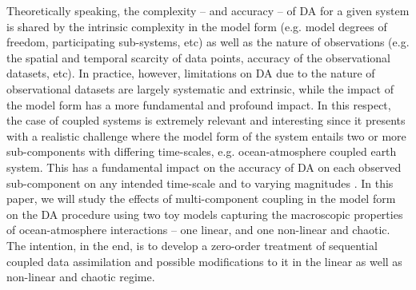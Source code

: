 \documentclass[a4paper,10pt]{article}
\begin{document}
\begin{multicols}{2}
Theoretically speaking, the complexity -- and accuracy -- of \textsf{DA} for a given system is shared by the intrinsic complexity in the model form (e.g. model degrees of freedom, participating sub-systems, etc) as well as the nature of observations (e.g. the spatial and temporal scarcity of data points, accuracy of the observational datasets, etc). In practice, however, limitations on \textsf{DA} due to the nature of observational datasets are largely systematic and extrinsic, while the impact of the model form has a more fundamental and profound impact. In this respect, the case of coupled systems is extremely relevant and interesting since it presents with a realistic challenge where the model form of the system entails two or more sub-components with differing time-scales, e.g. ocean-atmosphere coupled earth system. This has a fundamental impact on the accuracy of \textsf{DA} on each observed sub-component on any intended time-scale and to varying magnitudes \citep{tondeur2019, penny2019}. In this paper, we will study the effects of multi-component coupling in the model form on the \textsf{DA} procedure using two toy models capturing the macroscopic properties of ocean-atmosphere interactions -- one linear, and one non-linear and chaotic. The intention, in the end, is to develop a zero-order treatment of sequential coupled data assimilation and possible modifications to it in the linear as well as non-linear and chaotic regime.


\end{multicols}
\end{document}
